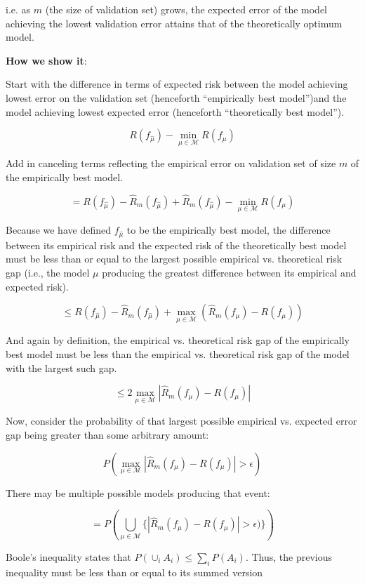 \documentclass{article}
\begin{document}
i.e. as $m$ (the size of validation set) grows, the expected error of the model
achieving the lowest validation error attains that of the theoretically optimum
model.

\medskip

\textbf{How we show it}:

\medskip

Start with the difference in terms of expected risk between the model achieving lowest error on the
validation set (henceforth ``empirically best model'')and the model achieving
lowest expected error (henceforth ``theoretically best model'').

$$
R(f_{\hat{\mu}}) - \min_{\mu \in \mathcal{M}} R(f_\mu)
$$

Add in canceling terms reflecting the empirical error on validation set of size
$m$ of the empirically best model.

$$
= R(f_{\hat{\mu}}) -  \hat{R}_m(f_{\hat{\mu}}) + \hat{R}_m(f_{\hat{\mu}})- \min_{\mu \in \mathcal{M}} R(f_\mu)
$$

Because we have defined $f_{\hat{\mu}}$ to be the empirically best model, the
difference between its empirical risk and the expected risk of the theoretically
best model must be less than or equal to the largest possible empirical vs.
theoretical risk gap (i.e., the model $\mu$ producing the greatest difference
between its empirical and expected risk).

$$
\leq R(f_{\hat{\mu}}) -  \hat{R}_m(f_{\hat{\mu}}) + \max_{\mu \in
\mathcal{M}}(\hat{R}_m(f_\mu) -  R(f_\mu))
$$

And again by definition, the empirical vs. theoretical risk gap of the empirically best model
must be less than the empirical vs. theoretical risk gap of the model with the
largest such gap.

$$
\leq 2 \max_{\mu \in \mathcal{M}}|\hat{R}_m(f_\mu) -  R(f_\mu)|
$$

Now, consider the probability of that largest possible empirical vs. expected error gap 
being greater than some arbitrary amount:

$$
P( \max_{\mu \in \mathcal{M}}|\hat{R}_m(f_\mu) -  R(f_\mu)| > \epsilon)
$$

There may be multiple possible models producing that event: 

$$
= P\left(\bigcup_{\mu \in \mathcal{M}} \{ |\hat{R}_m(f_\mu) -  R(f_\mu)| >
\epsilon)\}\right)
$$

Boole's inequality states that $P\left( \cup_i A_i \right) \leq \sum_i
P(A_i)$. Thus, the previous inequality must be less than or equal to its summed
version
\end{document}
